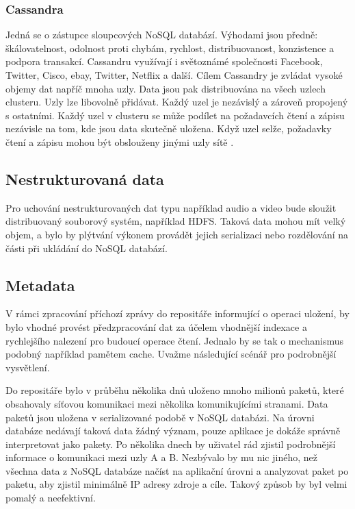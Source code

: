 \subsubsection{Cassandra}
Jedná se o zástupce sloupcových NoSQL databází. Výhodami jsou předně: škálovatelnost, odolnost proti chybám, rychlost, distribuovanost, konzistence a podpora transakcí. Cassandru využívají i světoznámé společnosti Facebook, Twitter, Cisco, ebay, Twitter, Netflix a další. Cílem Cassandry je zvládat vysoké objemy dat napříč mnoha uzly. Data jsou pak distribuována na všech uzlech clusteru. Uzly lze libovolně přidávat. Každý uzel je nezávislý a zároveň propojený s ostatními. Každý uzel v clusteru se může podílet na požadavcích čtení a zápisu nezávisle na tom, kde jsou data skutečně uložena. Když uzel selže, požadavky čtení a zápisu mohou být obslouženy jinými uzly sítě \cite{cassandraTutorialsPoint}.

\subsection{Nestrukturovaná data}
Pro uchování nestrukturovaných dat typu například audio a video bude sloužit distribuovaný souborový systém, například HDFS. Taková data mohou mít velký objem, a bylo by plýtvání výkonem provádět jejich serializaci nebo rozdělování na části při ukládání do NoSQL databází.

\subsection{Metadata} \label{metadata}
V rámci zpracování příchozí zprávy do repositáře informující o operaci uložení, by bylo vhodné provést předzpracování dat za účelem vhodnější indexace a rychlejšího nalezení pro budoucí operace čtení. Jednalo by se tak o mechanismus podobný například pamětem cache. Uvažme následující scénář pro podrobnější vysvětlení.

Do repositáře bylo v průběhu několika dnů uloženo mnoho milionů paketů, které obsahovaly síťovou komunikaci mezi několika komunikujícími stranami. Data paketů jsou uložena v serializované podobě v NoSQL databázi. Na úrovni databáze nedávají taková data žádný význam, pouze aplikace je dokáže správně interpretovat jako pakety. Po několika dnech by uživatel rád zjistil podrobnější informace o komunikaci mezi uzly A a B. Nezbývalo by mu nic jiného, než všechna data z NoSQL databáze načíst na aplikační úrovni a analyzovat paket po paketu, aby zjistil minimálně IP adresy zdroje a cíle. Takový způsob by byl velmi pomalý a neefektivní.

